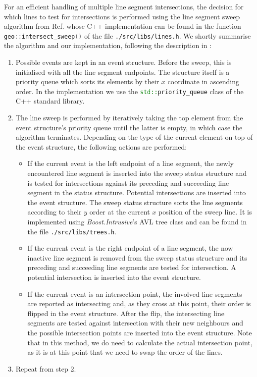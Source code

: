 For an efficient handling of multiple line segment intersections, the decision for which lines to test for intersections is
performed using the line segment sweep algorithm from Ref. \cite[pp. 69-80]{FUH_geo2020} whose C++ implementation can be
found in the function \lstinline[language=C++]|geo::intersect_sweep()| of the file \lstinline|./src/libs/lines.h|.
We shortly summarise the algorithm and our implementation, following the description in \cite[pp. 69-80]{FUH_geo2020}:
\begin{enumerate}
	\item Possible events are kept in an event structure. Before the sweep, this is initialised with all the line segment
		endpoints. The structure itself is a priority queue which sorts its elements by their $x$ coordinate in ascending order.
		In the implementation we use the \lstinline[language=C++]|std::priority_queue| class of the C++ standard library.
	\item The line sweep is performed by iteratively taking the top element from the event structure's priority queue until
		the latter is empty, in which case the algorithm terminates.
		Depending on the type of the current element on top of the event structure, the following actions are performed:
		\begin{itemize}
			\item If the current event is the left endpoint of a line segment, the newly encountered line segment is
				inserted into the sweep status structure and is tested for intersections against its preceding and succeeding
				line segment in the status structure. Potential intersections are inserted into the event structure.
				The sweep status structure sorts the line segments according to their $y$ order at the current $x$ position
				of the sweep line. It is implemented using \textit{Boost.Intrusive}'s \cite{web_boost_intrusive}
				AVL tree class \cite{web_boost_intrusive_avltree} and can be found in the file \lstinline|./src/libs/trees.h|.
			\item If the current event is the right endpoint of a line segment, the now inactive line segment is
				removed from the sweep status structure and its preceding and succeeding line segments are tested
				for intersection. A potential intersection is inserted into the event structure.
			\item If the current event is an intersection point, the involved line segments are reported as intersecting
				and, as they cross at this point, their order is flipped in the event structure.
				After the flip, the intersecting line segments are tested against intersection with their new neighbours
				and the possible intersection points are inserted into the event structure.
				Note that in this method, we do need to calculate the actual intersection point, as it is at this point
				that we need to swap the order of the lines.
		\end{itemize}
	\item Repeat from step 2.
\end{enumerate}


